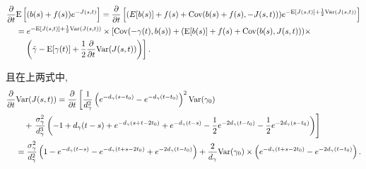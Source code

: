 \documentclass[notitlepage,cs4size,punct,oneside]{ctexrep}
\numberwithin{equation}{section}
\theoremstyle{mystyle}
\begin{document}
\[
\begin{split}
\frac{\partial}{\partial t}&\text{E}\left[(b(s)+f(s))e^{-J(s, t)}\right] = \frac{\partial}{\partial t}\left[(E[b(s)]+f(s)+\text{Cov}(b(s)+f(s), -J(s, t)))e^{-\text{E}[J(s, t)]+\frac{1}{2}\text{Var}(J(s, t))}\right] \\
&= e^{-\text{E}[J(s, t)]+\frac{1}{2}\text{Var}(J(s, t))}\times\left[\text{Cov}(-\gamma(t), b(s))+(\text{E}[b(s)]+f(s)+\text{Cov}(b(s), J(s, t)))\times \right. \\
&\quad \left.\left(\hat\gamma - \text{E}[\gamma(t)]+\frac{1}{2}\frac{\partial}{\partial t}\text{Var}(J(s, t))\right)\right].
\end{split}
\]

且在上两式中,
\[
\begin{split}
\frac{\partial}{\partial t}&\text{Var}(J(s, t)) = \frac{\partial}{\partial t}\left[\frac{1}{d_\gamma^2}\left(e^{-d_\gamma(s-t_0)}-e^{-d_\gamma(t-t_0)}\right)^2\text{Var}(\gamma_0)\right. \\
&\quad+ \left.\frac{\sigma_\gamma^2}{d_\gamma^3}\left(-1+d_\gamma(t-s)+e^{-d_\gamma(s+t-2t_0)}+e^{-d_\gamma(t-s)}-\frac{1}{2}e^{-2d_\gamma(t-t_0)}-\frac{1}{2}e^{-2d_\gamma(s-t_0)}\right)\right] \\
&= \frac{\sigma_\gamma^2}{d_\gamma^2}\left(1-e^{-d_\gamma(t-s)}-e^{-d_\gamma(t+s-2t_0)}+e^{-2d_\gamma(t-t_0)}\right)+\frac{2}{d_\gamma}\text{Var}(\gamma_0)\times\left(e^{-d_\gamma(t+s-2t_0)}-e^{-2d_\gamma(t-t_0)}\right).
\end{split}
\]
\end{document}
